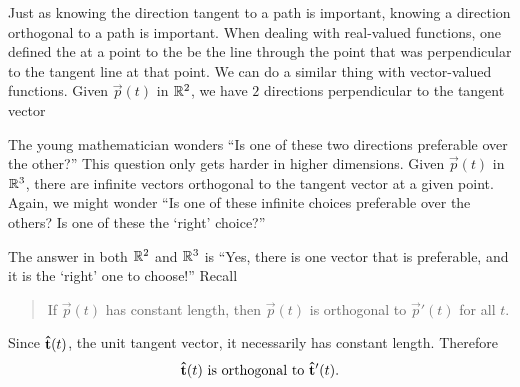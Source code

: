 \documentclass{ximera}
\begin{document}
Just as knowing the direction tangent to a path is important, knowing
a direction orthogonal to a path is important. When dealing with
real-valued functions, one defined the  at a point to
the be the line through the point that was perpendicular to the
tangent line at that point. We can do a similar thing with
vector-valued functions. Given $\vec{p}(t)$ in $\mathbb R^2$, we have $2$
directions perpendicular to the tangent vector
\begin{image}
\end{image}
The young mathematician wonders ``Is one of these two directions
preferable over the other?''  This question only gets harder in higher
dimensions.  Given $\vec{p}(t)$ in $\mathbb R^3$, there are infinite vectors
orthogonal to the tangent vector at a given point. Again, we might
wonder ``Is one of these infinite choices preferable over the others?
Is one of these the `right' choice?''

The answer in both $\mathbb R^2$ and $\mathbb R^3$ is ``Yes, there is one vector
that is preferable, and it is the `right' one to choose!'' Recall
\begin{quote}
If $\vec{p}(t)$ has constant length, then $\vec{p}(t)$ is orthogonal
to $\vec{p}'(t)$ for all $t$.
\end{quote}
Since $\mathbf{\hat{t}}(t)$, the unit tangent vector, it necessarily has
constant length. Therefore
\[\index{vector-valued function!of constant length}
\utan(t)\text{ is orthogonal to }\utan'(t).
\]
\end{document}
